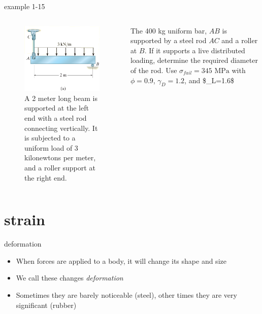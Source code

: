 \documentclass[
  letterpaper,
  ignorenonframetext,
  aspectratio=43,
  handout,
  12pt]{beamer}
\providecommand{\tightlist}{%
  \setlength{\itemsep}{0pt}\setlength{\parskip}{0pt}}
\providecommand{\tightlist}{%
\setlength{\itemsep}{0pt}\setlength{\parskip}{0pt}}
\let\Oldincludegraphics\includegraphics
\renewcommand{\includegraphics}[2][]{\Oldincludegraphics[width=\textwidth,height=0.7\textheight,keepaspectratio]{#2}}
\begin{document}
\begin{frame}{example 1-15}
\protect\hypertarget{example-1-15}{}
\begin{columns}[T]
\begin{column}{0.5\textwidth}
\begin{figure}
\centering
\includegraphics{../images/example-1-15.png}
\caption{A 2 meter long beam is supported at the left end with a steel
rod connecting vertically. It is subjected to a uniform load of 3
kilonewtons per meter, and a roller support at the right end.}
\end{figure}
\end{column}

\begin{column}{0.5\textwidth}
The 400 kg uniform bar, \(AB\) is supported by a steel rod \(AC\) and a
roller at \(B\). If it supports a live distributed loading, determine
the required diameter of the rod. Use \(\sigma_{fail}=345 \text{ MPa}\)
with \(\phi=0.9\), \(\gamma_D=1.2\), and \$\gamma\_L=1.6\$
\end{column}
\end{columns}
\end{frame}

\hypertarget{strain}{%
\section{strain}\label{strain}}

\begin{frame}{deformation}
\protect\hypertarget{deformation}{}
\begin{itemize}
\tightlist
\item
  When forces are applied to a body, it will change its shape and size
\item
  We call these changes \emph{deformation}
\item
  Sometimes they are barely noticeable (steel), other times they are
  very significant (rubber)
\end{itemize}
\end{frame}
\end{document}
